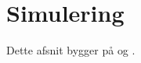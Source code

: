 \chapter{Simulering}
Dette afsnit bygger på \cite{sandsynlighedsBog} og \cite{grimsandsynlighedsBog}.


